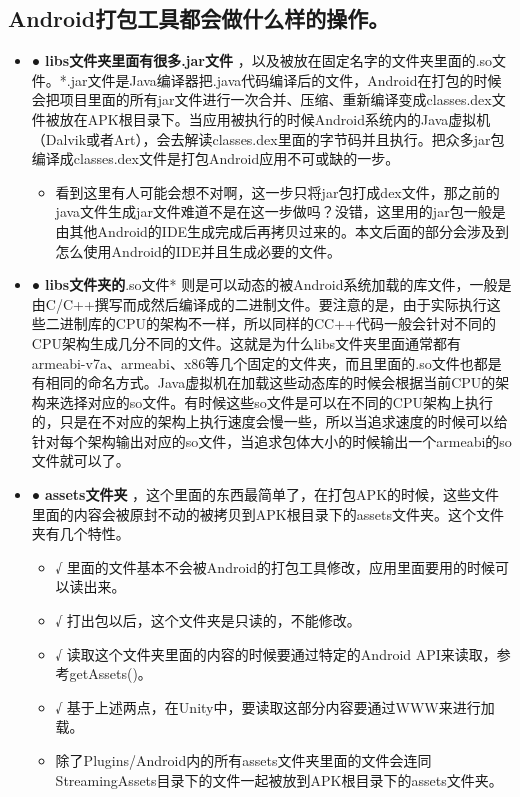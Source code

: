 \documentclass[9pt, b5paper]{article}
\begin{document}
\subsection{Android打包工具都会做什么样的操作。}
\label{sec-4-1}
\begin{itemize}
\item ● \textbf{libs文件夹里面有很多.jar文件} ，以及被放在固定名字的文件夹里面的.so文件。*.jar文件是Java编译器把.java代码编译后的文件，Android在打包的时候会把项目里面的所有jar文件进行一次合并、压缩、重新编译变成classes.dex文件被放在APK根目录下。当应用被执行的时候Android系统内的Java虚拟机（Dalvik或者Art），会去解读classes.dex里面的字节码并且执行。把众多jar包编译成classes.dex文件是打包Android应用不可或缺的一步。
\begin{itemize}
\item 看到这里有人可能会想不对啊，这一步只将jar包打成dex文件，那之前的java文件生成jar文件难道不是在这一步做吗？没错，这里用的jar包一般是由其他Android的IDE生成完成后再拷贝过来的。本文后面的部分会涉及到怎么使用Android的IDE并且生成必要的文件。
\end{itemize}
\item ● \textbf{libs文件夹的}.so文件* 则是可以动态的被Android系统加载的库文件，一般是由C/C++撰写而成然后编译成的二进制文件。要注意的是，由于实际执行这些二进制库的CPU的架构不一样，所以同样的CC++代码一般会针对不同的CPU架构生成几分不同的文件。这就是为什么libs文件夹里面通常都有armeabi-v7a、armeabi、x86等几个固定的文件夹，而且里面的.so文件也都是有相同的命名方式。Java虚拟机在加载这些动态库的时候会根据当前CPU的架构来选择对应的so文件。有时候这些so文件是可以在不同的CPU架构上执行的，只是在不对应的架构上执行速度会慢一些，所以当追求速度的时候可以给针对每个架构输出对应的so文件，当追求包体大小的时候输出一个armeabi的so文件就可以了。
\item ● \textbf{assets文件夹} ，这个里面的东西最简单了，在打包APK的时候，这些文件里面的内容会被原封不动的被拷贝到APK根目录下的assets文件夹。这个文件夹有几个特性。
\begin{itemize}
\item √ 里面的文件基本不会被Android的打包工具修改，应用里面要用的时候可以读出来。
\item √ 打出包以后，这个文件夹是只读的，不能修改。
\item √ 读取这个文件夹里面的内容的时候要通过特定的Android API来读取，参考getAssets()。
\item √ 基于上述两点，在Unity中，要读取这部分内容要通过WWW来进行加载。
\item 除了Plugins/Android内的所有assets文件夹里面的文件会连同StreamingAssets目录下的文件一起被放到APK根目录下的assets文件夹。

\end{itemize}
\end{itemize}
\end{document}
